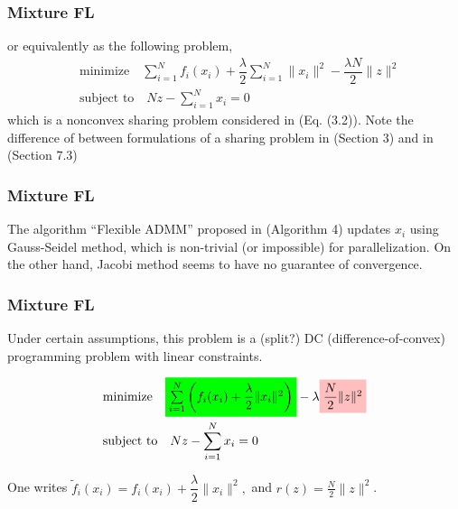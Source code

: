 
\begin{frame}
\frametitle{Mixture FL}

or equivalently as the following problem,
\begin{align*}
    & \text{minimize} \quad \sum\limits_{i=1}^N f_i(x_i) + \dfrac{\lambda}{2} \sum\limits_{i=1}^N \lVert x_i \rVert^2 -\dfrac{\lambda N}{2} \lVert z \rVert^2 \\
    & \text{subject to} \quad Nz - \sum\limits_{i=1}^N x_i = 0
\end{align*}
which is a nonconvex sharing problem considered in \cite{hong2016convergence} (Eq. (3.2)). Note the difference of between formulations of a sharing problem in \cite{hong2016convergence} (Section 3) and in \cite{boyd2011distributed} (Section 7.3)


\end{frame}


\begin{frame}
\frametitle{Mixture FL}

The algorithm ``Flexible ADMM'' proposed in \cite{hong2016convergence} (Algorithm 4) updates $x_i$ using Gauss-Seidel method, which is non-trivial (or impossible) for parallelization. On the other hand, Jacobi method seems to have no guarantee of convergence.


\end{frame}


\begin{frame}
\frametitle{Mixture FL}

Under certain assumptions, this problem is a (split?) DC (difference-of-convex) programming problem {\color{red} with linear constraints}.

\begin{align*}
    & \text{minimize} \quad \colorbox{green}{$\sum\limits_{i=1}^N \left( f_i(x_i) + \dfrac{\lambda}{2} \lVert x_i \rVert^2 \right)$} - \lambda \colorbox{pink}{$\dfrac{N}{2} \lVert z \rVert^2$} \\
    & \text{subject to} \quad Nz - \sum\limits_{i=1}^N x_i = 0
\end{align*}

One writes $\widetilde{f}_i (x_i) =  f_i(x_i) + \dfrac{\lambda}{2} \lVert x_i \rVert^2,$ and $r(z) = \frac{N}{2} \lVert z \rVert^2$.

\end{frame}

